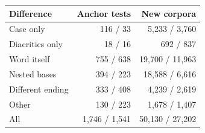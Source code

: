 \begin{tabular*}{\columnwidth}{@{\extracolsep{\fill}}lrr@{}}
\toprule Difference & Anchor tests & New corpora \\\midrule
Case only & 116 / 33 & 5,233 / 3,760 \\
Diacritics only & 18 / 16 & 692 / 837 \\
Word itself & 755 / 638 & 19,700 / 11,963 \\
Nested bases & 394 / 223 & 18,588 / 6,616 \\
Different ending & 333 / 408 & 4,239 / 2,619 \\
Other & 130 / 223 & 1,678 / 1,407 \\
\midrule All & 1,746 / 1,541 & 50,130 / 27,202 \\
\bottomrule\end{tabular*}
